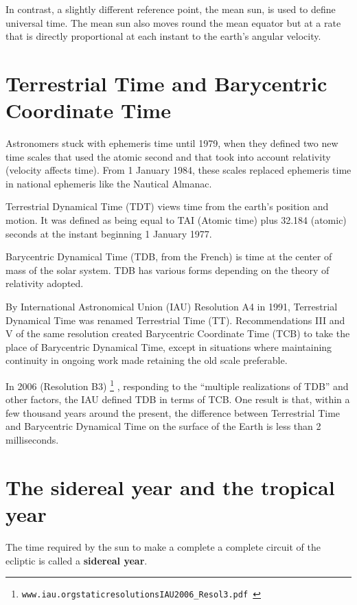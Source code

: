 In contrast, a slightly different reference point, the mean sun,
is used to define universal time. The mean sun also moves round the mean 
equator but at a rate that is directly proportional at each instant to the 
earth's angular velocity. 

\section{Terrestrial Time and Barycentric Coordinate Time}

Astronomers stuck with ephemeris time until 1979, when they defined two new 
time scales that used the atomic second and that took into account 
relativity (velocity affects time). From 1 January 1984, these scales 
replaced ephemeris time in national ephemeris like the Nautical Almanac.

Terrestrial Dynamical Time (TDT) views time from the earth's position and 
motion. It was defined as being equal to TAI (Atomic time) plus 
32.184 (atomic) seconds at the instant beginning 1 January 1977.

Barycentric Dynamical Time (TDB, from the French) is time at the center of 
mass of the solar system. TDB has various forms depending on the theory of 
relativity adopted.

By International Astronomical Union (IAU) Resolution A4 in 1991, 
Terrestrial Dynamical Time was renamed Terrestrial Time (TT). 
Recommendations III and V of the same resolution created 
Barycentric Coordinate Time (TCB) to take the place of Barycentric 
Dynamical Time, except in situations where maintaining continuity in 
ongoing work made retaining the old scale preferable.

In 2006 (Resolution B3)
\footnote{
\tt www.iau.org\/static\/resolutions\/IAU2006\_Resol3.pdf
}
, responding to the ``multiple realizations of TDB''
and other factors, the IAU defined TDB in terms of TCB. One result is that, 
within a few thousand years around the present, the difference between 
Terrestrial Time and Barycentric Dynamical Time on the surface of the Earth 
is less than 2 milliseconds. 

\section{The sidereal year and the tropical year}

The time required by the sun to make a complete a complete circuit of the 
ecliptic is called a {\bf sidereal year}. 

